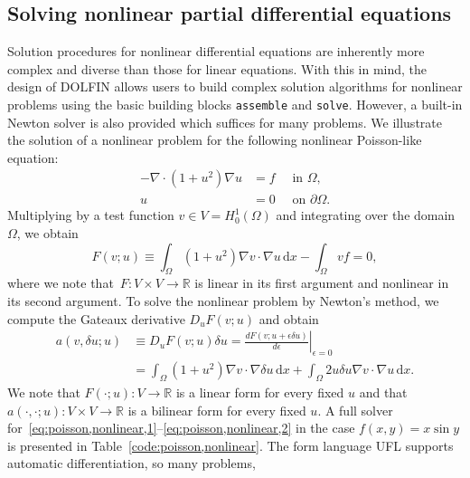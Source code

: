 \documentclass[acmtoms]{acmtrans2m}
\newcommand{\brac}[1]{\left( {#1} \right)}
\newcommand{\dx}{\,\mathrm{d}x}
\newcommand{\R}{\mathbb{R}}
\newcommand{\emp}[1]{\texttt{#1}}
\newcommand{\dolfin}{DOLFIN}
\begin{document}
\subsection{Solving nonlinear partial differential equations}
\label{sec:nonlinear-pde}
Solution procedures for nonlinear differential equations are
inherently more complex and diverse than those for linear
equations. With this in mind, the design of \dolfin{} allows users to
build complex solution algorithms for nonlinear problems using the
basic building blocks \emp{assemble} and \emp{solve}. However, a
built-in Newton solver is also provided which suffices for many
problems. We illustrate the solution of a nonlinear problem for the
following nonlinear Poisson-like equation:
\begin{align}
  \label{eq:poisson,nonlinear,1}
  - \nabla \cdot \brac{1+ u^{2}} \nabla  u &= f \quad \mbox{ in } \Omega, \\
  \label{eq:poisson,nonlinear,2}
  u &= 0 \quad \mbox{ on } \partial\Omega.
\end{align}
Multiplying by a test function $v \in V = H^1_0(\Omega)$ and
integrating over the domain $\Omega$, we obtain
\begin{equation}
 F(v; u) \equiv \int_{\Omega} \brac{1+ u^{2}} \nabla v \cdot \nabla  u \dx
 - \int_{\Omega} v f = 0,
\label{eqn:nonlinear_functional}
\end{equation}
where we note that~$F : V \times V \rightarrow \R$ is linear in its
first argument and nonlinear in its second argument. To solve the
nonlinear problem by Newton's method, we compute the Gateaux
derivative $D_{u}F(v; u)$ and obtain
\begin{equation}
  \begin{split}
  a(v, \delta u; u) &\equiv D_uF(v; u) \delta u
  = \left. \frac{dF(v; u + \epsilon \delta u)}{d\epsilon} \right|_{\epsilon =0} \\
  &= \int_{\Omega} \brac{1+ u^{2}} \nabla v \cdot \nabla \delta u \dx
  + \int_{\Omega} 2 u \delta u \nabla v \cdot \nabla  u \dx.
  \end{split}
\end{equation}
We note that $F(\cdot; u) : V \rightarrow \R$ is a linear form for
every fixed $u$ and that $a(\cdot, \cdot; u) : V \times V
\rightarrow \R$ is a bilinear form for every fixed $u$. A full
solver
for~\eqref{eq:poisson,nonlinear,1}--\eqref{eq:poisson,nonlinear,2} in
the case $f(x, y) = x \sin y$ is presented in
Table~\ref{code:poisson,nonlinear}.
The form language UFL supports automatic differentiation, so many problems,
\end{document}
